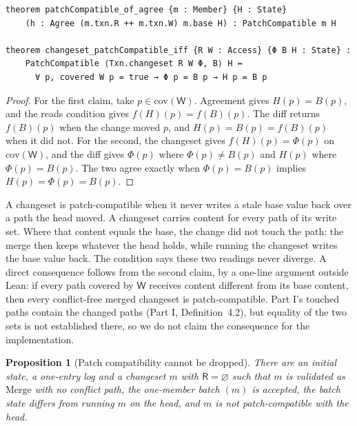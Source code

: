 \documentclass[11pt,letterpaper]{article}
\newtheorem{proposition}[theorem]{Proposition}
\theoremstyle{definition}
\theoremstyle{remark}
\newcommand{\R}{\mathsf{R}}
\newcommand{\W}{\mathsf{W}}
\newcommand{\op}[1]{\mathrm{#1}}
\newcommand{\covd}{\op{cov}}
\newcommand{\Mg}{\mathrm{Merge}}
\begin{document}
\begin{lstlisting}[language=Lean,caption={Patch compatibility for clean members and for changesets (\texttt{YonedaTx/Batch.lean})},label={lst:mcbl:pcagree}]
theorem patchCompatible_of_agree {m : Member} {H : State}
    (h : Agree (m.txn.R ++ m.txn.W) m.base H) : PatchCompatible m H

theorem changeset_patchCompatible_iff {R W : Access} {Φ B H : State} :
    PatchCompatible ⟨Txn.changeset R W Φ, B⟩ H ↔
      ∀ p, covered W p = true → Φ p = B p → H p = B p
\end{lstlisting}

\begin{proof}
For the first claim, take $p\in\covd(\W)$. Agreement gives $H(p)=B(p)$, and the reads condition gives $f(H)(p)=f(B)(p)$. The diff returns $f(B)(p)$ when the change moved $p$, and $H(p)=B(p)=f(B)(p)$ when it did not. For the second, the changeset gives $f(H)(p)=\Phi(p)$ on $\covd(\W)$, and the diff gives $\Phi(p)$ where $\Phi(p)\neq B(p)$ and $H(p)$ where $\Phi(p)=B(p)$. The two agree exactly when $\Phi(p)=B(p)$ implies $H(p)=\Phi(p)=B(p)$.
\end{proof}

A changeset is patch-compatible when it never writes a stale base value back over a path the head moved. A changeset carries content for every path of its write set. Where that content equals the base, the change did not touch the path: the merge then keeps whatever the head holds, while running the changeset writes the base value back. The condition says these two readings never diverge. A direct consequence follows from the second claim, by a one-line argument outside Lean: if every path covered by $\W$ receives content different from its base content, then every conflict-free merged changeset is patch-compatible. Part I's touched paths contain the changed paths (Part I, Definition~4.2), but equality of the two sets is not established there, so we do not claim the consequence for the implementation.

\begin{proposition}[Patch compatibility cannot be dropped]
\label{prop:mcbl:mergece}
There are an initial state, a one-entry log and a changeset $m$ with $\R=\varnothing$ such that $m$ is validated as $\Mg$ with no conflict path, the one-member batch $(m)$ is accepted, the batch state differs from running $m$ on the head, and $m$ is not patch-compatible with the head.
\end{proposition}
\end{document}
